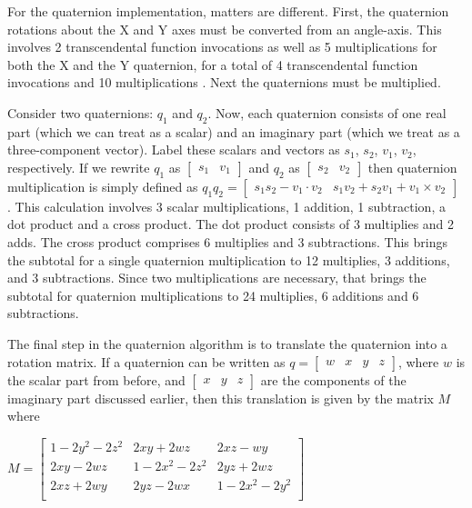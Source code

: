 \documentclass{acm_proc_article-sp}
\begin{document}
For the quaternion implementation, matters are different.
First, the quaternion rotations about the X and Y axes must be converted from an angle-axis.
This involves 2 transcendental function invocations as well as 5 multiplications for both the X and the Y quaternion, for a total of 4 transcendental function invocations and 10 multiplications \parencite{glm:quat:angleAxis}.
Next the quaternions must be multiplied.

Consider two quaternions: $q_1$ and $q_2$.
Now, each quaternion consists of one real part (which we can treat as a scalar) and an imaginary part (which we treat as a three-component vector).
Label these scalars and vectors as $s_1$, $s_2$, $v_1$, $v_2$, respectively.
If we rewrite $q_1$ as $\left[ \begin{array}{cc} s_1 & v_1 \end{array} \right]$ and $q_2$ as $\left[ \begin{array}{cc} s_2 & v_2 \end{array} \right]$ then quaternion multiplication is simply defined as $q_1 q_2 = \left[ \begin{array}{cc} s_1 s_2 - v_1 \cdot v_2 & s_1 v_2 + s_2 v_1 + v_1 \times v_2 \end{array} \right]$ \parencite{schoemake85}.
This calculation involves 3 scalar multiplications, 1 addition, 1 subtraction, a dot product and a cross product.
The dot product consists of 3 multiplies and 2 adds.
The cross product comprises 6 multiplies and 3 subtractions.
This brings the subtotal for a single quaternion multiplication to 12 multiplies, 3 additions, and 3 subtractions.
Since two multiplications are necessary, that brings the subtotal for quaternion multiplications to 24 multiplies, 6 additions and 6 subtractions.

The final step in the quaternion algorithm is to translate the quaternion into a rotation matrix.
If a quaternion can be written as $q = \left[ \begin{array}{cccc} w & x & y & z \end{array} \right]$, where $w$ is the scalar part from before, and $\left[ \begin{array}{ccc} x & y & z \end{array} \right]$ are the components of the imaginary part discussed earlier, then this translation is given by the matrix $M$ where

$M = \left[ \begin{array}{ccc}
    1 - 2y^2 - 2z^2 & 2xy + 2wz & 2xz - wy \\
    2xy - 2wz & 1 - 2x^2 - 2z^2 & 2yz + 2wz \\
    2xz + 2wy & 2yz - 2wx & 1 - 2x^2 - 2y^2 \\
    \end{array}\right]$
\end{document}
